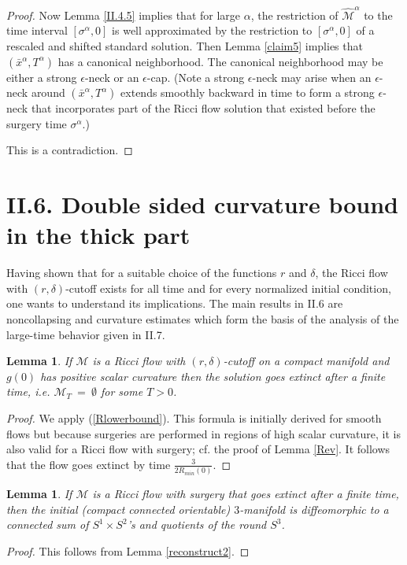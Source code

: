 \documentclass[12pt]{amsart}
\newcommand{\al}{\alpha}
\newcommand{\M}{{\mathcal M}}
\newcommand{\si}{\sigma}
\newcommand{\de}{\delta}
\numberwithin{equation}{section}
\theoremstyle{plain}
\newtheorem{lemma}[equation]{Lemma}
\theoremstyle{definition}
\theoremstyle{remark}
\begin{document}
\begin{proof}
Now Lemma \ref{II.4.5} implies that for large $\al$,
the restriction of 
$\widehat\M^\al$ to the time interval $[\si^\al,0]$ is well
approximated by the restriction to $[\si^\al,0]$
of a rescaled and shifted standard
solution. Then Lemma \ref{claim5} implies that $(\bar x^\al,T^\al)$
has a canonical neighborhood.
The canonical neighborhood may be either a strong $\epsilon$-neck
or an $\epsilon$-cap. (Note 
a strong $\epsilon$-neck may arise when an 
$\epsilon$-neck around
$(\bar x^\al,T^\al)$ extends smoothly backward in time to form
a strong $\epsilon$-neck that incorporates part of the Ricci flow 
solution that existed before the surgery time $\si^\al$.)

This is a contradiction.
\end{proof}

\section{II.6. Double sided curvature bound in the thick part}
\label{II.6}

Having shown that for a suitable choice of the functions $r$ and $\de$,
the Ricci flow with $(r,\de)$-cutoff exists for all time and for every 
normalized initial condition, one wants to understand
its implications. 
The main results in II.6 are noncollapsing and curvature estimates
which form the basis of the analysis of the large-time behavior given 
in II.7.

\begin{lemma} \label{pscempty}
If $\M$ is a Ricci flow with $(r,\de)$-cutoff on a compact manifold and
$g(0)$ has positive scalar curvature then the solution goes extinct
after a finite time, i.e. $\M_T \: = \: \emptyset$ for some $T > 0$.
\end{lemma}
\begin{proof}
We apply (\ref{Rlowerbound}). This
formula is initially derived for smooth flows but because surgeries are
performed in regions of high scalar curvature, it is also valid for a Ricci 
flow with surgery; cf. the proof of Lemma \ref{Rev}. 
It follows that the flow goes extinct by time
$\frac{3}{2R_{min}(0)}$.
\end{proof}

\begin{lemma} \label{finitetime}
If $\M$ is a Ricci flow with surgery that goes extinct after a finite time,
then the initial (compact connected orientable) $3$-manifold is diffeomorphic to a 
connected sum of $S^1 \times S^2$'s and quotients of the round
$S^3$.
\end{lemma}
\begin{proof}
This follows from Lemma  \ref{reconstruct2}.
\end{proof}
\end{document}
